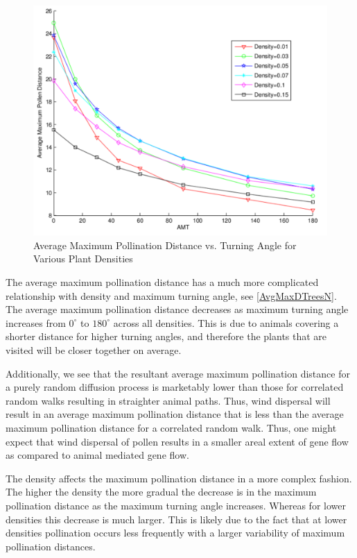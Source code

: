 \begin{figure}
  \begin{center}
  \includegraphics[scale=0.5]{MaxPollenVsAMT.pdf}
  \end{center}
  \caption{\small Average Maximum Pollination Distance vs. Turning Angle for Various Plant Densities}
  \label{AvgMaxDTreesN}
\end{figure}

The average maximum pollination distance has a much more complicated
relationship with density and maximum turning angle, see
\autoref{AvgMaxDTreesN}.  The average maximum pollination distance decreases as
maximum turning angle increases from $0^{\circ}$ to $180^{\circ}$ across all
densities.  This is due to animals covering a shorter distance for higher
turning angles, and therefore the plants that are visited will be closer
together on average. 

Additionally, we see that the resultant average maximum pollination distance for
a purely random diffusion process is marketably lower than those for correlated
random walks resulting in straighter animal paths. Thus, wind dispersal will
result in an average maximum pollination distance that is less than the average
maximum pollination distance for a correlated random walk. Thus, one might
expect that wind dispersal of pollen results in a smaller areal extent of gene
flow as compared to animal mediated gene flow.

The density affects the maximum pollination distance in a more complex fashion.
The higher the density the more gradual the decrease is in the maximum
pollination distance as the maximum turning angle increases.  Whereas for lower
densities this decrease is much larger.  This is likely due to the fact that at
lower densities pollination occurs less frequently with a larger variability of
maximum pollination distances.

